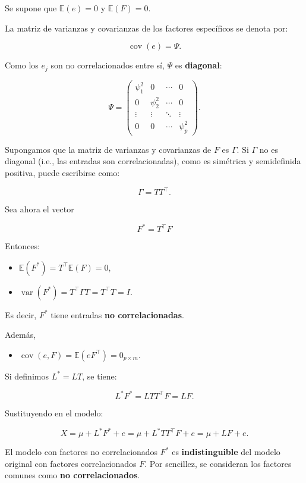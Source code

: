 \documentclass[
]{book}
\providecommand{\tightlist}{%
  \setlength{\itemsep}{0pt}\setlength{\parskip}{0pt}}
\begin{document}
Se supone que \(\mathbb{E}(e) = 0\) y \(\mathbb{E}(F) = 0\).

La matriz de varianzas y covarianzas de los factores específicos se denota por:

\[
\operatorname{cov}(e) = \Psi.
\]

Como los \(e_j\) son no correlacionados entre sí, \(\Psi\) es \textbf{diagonal}:

\[
\Psi =
\begin{pmatrix}
\psi_1^2 & 0        & \cdots & 0 \\
0        & \psi_2^2 & \cdots & 0 \\
\vdots   & \vdots   & \ddots & \vdots \\
0        & 0        & \cdots & \psi_p^2
\end{pmatrix}.
\]

Supongamos que la matriz de varianzas y covarianzas de \(F\) es \(\Gamma\). Si \(\Gamma\) no es diagonal (i.e., las entradas son correlacionadas), como es simétrica y semidefinida positiva, puede escribirse como:

\[
\Gamma = TT^\top.
\]

Sea ahora el vector

\[
F^* = T^\top F
\]

Entonces:

\begin{itemize}
\item
  \(\mathbb{E}(F^*) = T^{\top} \mathbb{E}(F) = 0\),
\item
  \(\operatorname{var}(F^*) = T^{\top} \Gamma T
  = T^\top T = I\).
\end{itemize}

Es decir, \(F^*\) tiene entradas \textbf{no correlacionadas}.

Además,

\begin{itemize}
\tightlist
\item
  \(\operatorname{cov}(e, F) = \mathbb{E}(eF^\top) = 0_{p\times m}\).
\end{itemize}

Si definimos \(L^* = L T\), se tiene:

\[
L^* F^* = L T T^\top F = L F.
\]

Sustituyendo en el modelo:

\[
X = \mu + L^* F^* + e = \mu + L^* TT^{\top}F + e = \mu + L F + e.
\]

El modelo con factores no correlacionados \(F^*\) es \textbf{indistinguible} del modelo original con factores correlacionados \(F\). Por sencillez, se consideran los factores comunes como \textbf{no correlacionados}.
\end{document}
